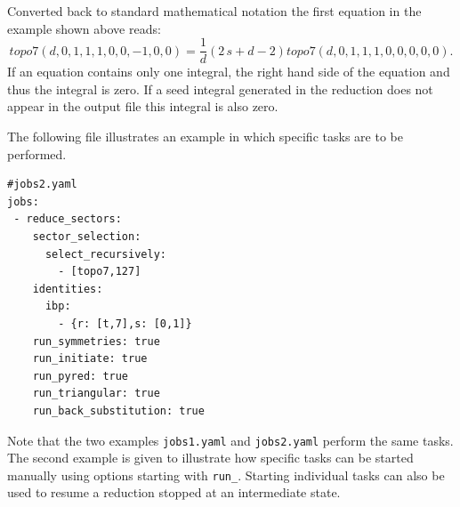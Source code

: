 \documentclass[a4paper,12pt]{scrartcl}
\begin{document}
Converted back to standard mathematical notation the first equation in
the example shown above reads:
\begin{equation}
  topo7(d,0,1,1,1,0,0,-1,0,0)=
  \frac{1}{d}(2\,s+d-2)
  topo7(d,0,1,1,1,0,0,0,0,0).
\end{equation}
If an equation contains only one integral, the right hand side of the
equation and thus the integral is zero.
If a seed integral generated in the reduction does not appear in the
output file this integral is also zero.

The following file illustrates an example in which specific tasks are
to be performed.
\begin{verbatim}
#jobs2.yaml
jobs:
 - reduce_sectors:
    sector_selection:
      select_recursively:
        - [topo7,127]
    identities:
      ibp:
        - {r: [t,7],s: [0,1]}
    run_symmetries: true
    run_initiate: true
    run_pyred: true
    run_triangular: true
    run_back_substitution: true
\end{verbatim}
Note that the two examples \texttt{jobs1.yaml} and \texttt{jobs2.yaml}
perform the same tasks. The second example is given to illustrate how
specific tasks can be started manually using options starting
with \texttt{run\_}.  Starting individual tasks can also be used to
resume a reduction stopped at an intermediate state.
\end{document}
